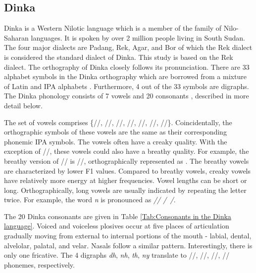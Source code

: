 \documentclass[a4paper]{article}
\begin{document}
\subsection{Dinka}  \vspace{-2mm}
Dinka is a Western Nilotic language which is a member of the family of Nilo-Saharan languages. It is spoken by over 2 million people living in South Sudan. The four major dialects are Padang, Rek, Agar, and Bor of which the Rek dialect is considered the standard dialect of Dinka. This study is based on the Rek dialect. The orthography of Dinka closely follows its pronunciation. There are 33 alphabet symbols in the Dinka orthography which are borrowed from a mixture of Latin and IPA alphabets \cite{DinkaOmniglot}. Furthermore, 4 out of the 33 symbols are digraphs. The Dinka phonology consists of 7 vowels and 20 consonants \cite{Remijsen-LuanyjangDinka}, described in more detail below.

The set of vowels comprises \{//, //, //, //, //, //, //\}. Coincidentally, the orthographic symbols of these vowels are the same as their corresponding phonemic IPA symbols. The vowels often have a creaky quality. With the exception of //, these vowels could also have a breathy quality. For example, the breathy version of // is //, orthographically represented as . The breathy vowels are characterized by lower F1 values. Compared to breathy vowels, creaky vowels have relatively more energy at higher frequencies. Vowel lengths can be short or long. Orthographically, long vowels are usually indicated by repeating the letter twice. For example, the word \emph{n} is pronounced as \emph{// /~/}.

The 20 Dinka consonants are given in Table \ref{Tab:Consonants in the Dinka language}. Voiced and voiceless plosives occur at five places of articulation gradually moving from external to internal portions of the mouth - labial, dental, alvelolar, palatal, and velar. Nasals follow a similar pattern. Interestingly, there is only one fricative. The 4 digraphs \emph{dh}, \emph{nh}, \emph{th}, \emph{ny} translate to /\textipa{\|[d}/, /\textipa{\|[n}/, /\textipa{\|[t}/, /\textltailn/ phonemes, respectively.
\end{document}
